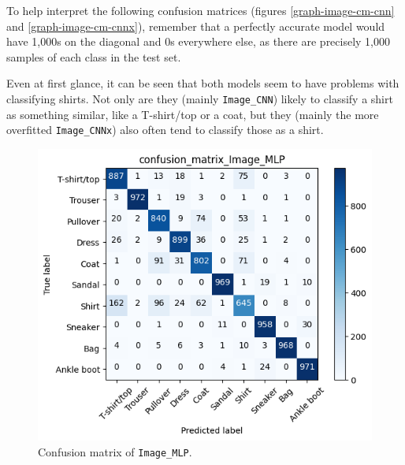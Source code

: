To help interpret the following confusion matrices (figures \ref{graph-image-cm-cnn} and \ref{graph-image-cm-cnnx}),
remember that a perfectly accurate model would have 1,000s on the diagonal and 0s everywhere else, as there
are precisely 1,000 samples of each class in the test set.

Even at first glance, it can be seen that both models seem to have problems with classifying shirts. Not only
are they (mainly \texttt{Image\_CNN}) likely to classify a shirt as something similar, like a T-shirt/top or a coat,
but they (mainly the more overfitted \texttt{Image\_CNNx}) also often tend to classify those as a shirt.
\pagebreak


\begin{figure}[!ht]
    \centering
    \begin{minipage}{0.48\textwidth}
        \centering
        \captionsetup{justification=centering}
        \includegraphics[width=\linewidth]{obrazky-figures/Image_experiment/confusion_matrix_Image_MLP_2023-03-27_21:34:27.png}
        \caption{Confusion matrix of \texttt{Image\_MLP}.}
        \label{graph-image-cm-mlp}
    \end{minipage}\hfill
    \begin{minipage}{0.48\textwidth}
        \centering
        \captionsetup{justification=centering}

\end{minipage}
\end{figure}
